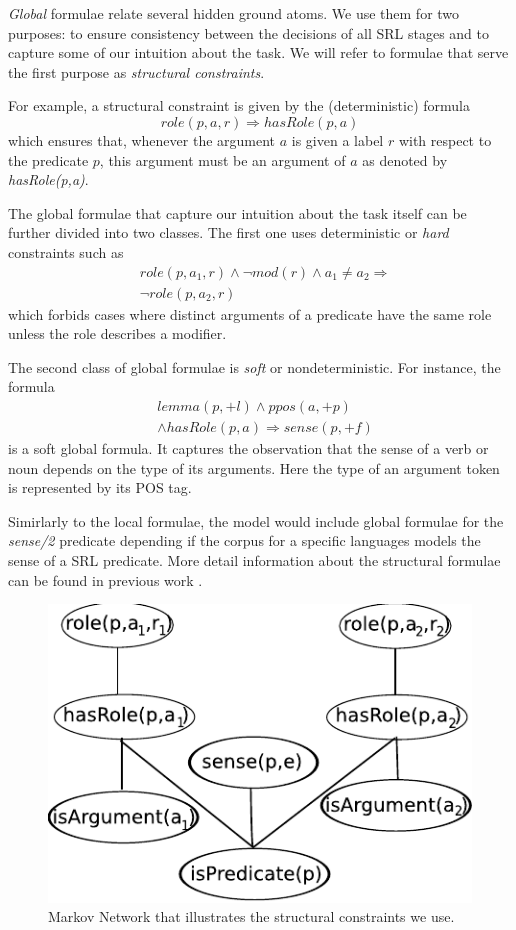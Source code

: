 
\emph{Global} formulae relate several hidden ground atoms. We use them for two 
purposes: to ensure consistency between the decisions of all SRL stages and to 
capture some of our intuition about the task. We will refer to formulae that 
serve the first purpose as \emph{structural constraints}. 

For example, a structural constraint is given by the (deterministic) formula
\[role(p,a,r) \Rightarrow hasRole(p,a)\]
which ensures that, whenever the argument $a$ is given a label $r$ with respect 
to the predicate $p$, this argument must be an argument of $a$ as denoted by 
\emph{hasRole(p,a)}.

The global formulae that capture our intuition about the task itself can be 
further divided into two classes. The first one uses deterministic or 
\emph{hard} constraints such as
\begin{eqnarray*}
 &role\left(p,a_{1},r\right)\wedge \neg mod\left(r\right)\wedge a_{1}\neq a_{2}  \Rightarrow\\
  & \neg role\left(p,a_{2},r\right)
\end{eqnarray*}
which forbids cases where distinct arguments of a predicate have the same role 
unless the role describes a modifier.

The second class of global formulae is \emph{soft} or nondeterministic. For 
instance, the formula
\begin{eqnarray*}
  & lemma(p,+l) \wedge ppos(a,+p)  \\
  & \wedge hasRole(p,a)  \Rightarrow sense(p,+f) 
\end{eqnarray*}
is a soft global formula. It captures the observation that the sense of a verb 
or noun depends on the type of its arguments. Here the type of an argument token 
is represented by its POS tag.

Simirlarly to the local formulae, the model would include global formulae for 
the \emph{sense/2} predicate depending if the corpus for a specific languages 
models the sense of a SRL predicate. More detail information about the 
structural formulae can be found in previous work 
\citep{riedel08conll,meza09jointly}.

\begin{figure}
\begin{center}
   \includegraphics[scale=.70]{GlobalFormula2}
\end{center}
\caption{Markov Network that illustrates the structural constraints we use.}
\label{fig:global2}
\end{figure}




